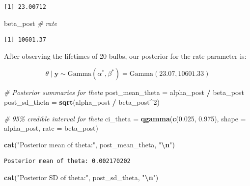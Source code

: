 \documentclass[
]{article}
\newenvironment{Shaded}{\begin{snugshade}}{\end{snugshade}}
\newcommand{\AttributeTok}[1]{\textcolor[rgb]{0.13,0.29,0.53}{#1}}
\newcommand{\CommentTok}[1]{\textcolor[rgb]{0.56,0.35,0.01}{\textit{#1}}}
\newcommand{\DecValTok}[1]{\textcolor[rgb]{0.00,0.00,0.81}{#1}}
\newcommand{\FloatTok}[1]{\textcolor[rgb]{0.00,0.00,0.81}{#1}}
\newcommand{\FunctionTok}[1]{\textcolor[rgb]{0.13,0.29,0.53}{\textbf{#1}}}
\newcommand{\NormalTok}[1]{#1}
\newcommand{\OtherTok}[1]{\textcolor[rgb]{0.56,0.35,0.01}{#1}}
\newcommand{\SpecialCharTok}[1]{\textcolor[rgb]{0.81,0.36,0.00}{\textbf{#1}}}
\newcommand{\StringTok}[1]{\textcolor[rgb]{0.31,0.60,0.02}{#1}}
\begin{document}
\begin{verbatim}
[1] 23.00712
\end{verbatim}

\begin{Shaded}
\begin{Highlighting}[]
\NormalTok{beta\_post }\CommentTok{\# rate}
\end{Highlighting}
\end{Shaded}

\begin{verbatim}
[1] 10601.37
\end{verbatim}

After observing the lifetimes of 20 bulbs, our posterior for the rate
parameter is:

\[
\theta \mid \mathbf{y} \sim \text{Gamma}(\alpha^*, \beta^*) = \text{Gamma}(23.07, 10601.33)
\]

\begin{Shaded}
\begin{Highlighting}[]
\CommentTok{\# Posterior summaries for theta}
\NormalTok{post\_mean\_theta }\OtherTok{=}\NormalTok{ alpha\_post }\SpecialCharTok{/}\NormalTok{ beta\_post}
\NormalTok{post\_sd\_theta }\OtherTok{=} \FunctionTok{sqrt}\NormalTok{(alpha\_post }\SpecialCharTok{/}\NormalTok{ beta\_post}\SpecialCharTok{\^{}}\DecValTok{2}\NormalTok{)}

\CommentTok{\# 95\% credible interval for theta}
\NormalTok{ci\_theta }\OtherTok{=} \FunctionTok{qgamma}\NormalTok{(}\FunctionTok{c}\NormalTok{(}\FloatTok{0.025}\NormalTok{, }\FloatTok{0.975}\NormalTok{), }\AttributeTok{shape =}\NormalTok{ alpha\_post, }\AttributeTok{rate =}\NormalTok{ beta\_post)}

\FunctionTok{cat}\NormalTok{(}\StringTok{"Posterior mean of theta:"}\NormalTok{, post\_mean\_theta, }\StringTok{"}\SpecialCharTok{\textbackslash{}n}\StringTok{"}\NormalTok{)}
\end{Highlighting}
\end{Shaded}

\begin{verbatim}
Posterior mean of theta: 0.002170202 
\end{verbatim}

\begin{Shaded}
\begin{Highlighting}[]
\FunctionTok{cat}\NormalTok{(}\StringTok{"Posterior SD of theta:"}\NormalTok{, post\_sd\_theta, }\StringTok{"}\SpecialCharTok{\textbackslash{}n}\StringTok{"}\NormalTok{)}
\end{Highlighting}
\end{Shaded}
\end{document}
